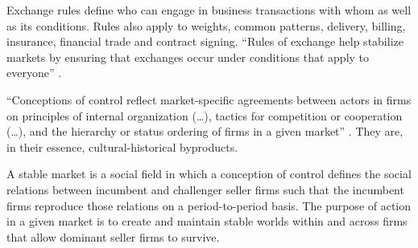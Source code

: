 \documentclass[a4paper, 12pt, openright, oneside, german, french, brazil, english]{abntex2}
\begin{document}
	Exchange rules define who can engage in business transactions with whom as well as its conditions. Rules also apply to weights, common patterns, delivery, billing, insurance, financial trade and contract signing. ``Rules of exchange help stabilize markets by ensuring that exchanges occur under conditions that apply to everyone'' \cite[p. 35]{fligstein2002architecture}.
	
	
	``Conceptions of control reflect market-specific agreements between actors in firms on principles of internal organization (\dots), tactics for competition or cooperation (\dots), and the hierarchy or status ordering of firms in a given market'' \cite[p. 35]{fligstein2002architecture}. They are, in their essence, cultural-historical byproducts.

	
	\begin{citacao}
		A stable market is a social field in which a conception of control defines the social relations between incumbent and challenger seller firms such that the incumbent firms reproduce those relations on a period-to-period basis. The purpose of action in a given market is to create and maintain stable worlds within and across firms that allow dominant seller firms to survive. \cite[p. 35]{fligstein2002architecture}
	\end{citacao}
	
\end{document}
